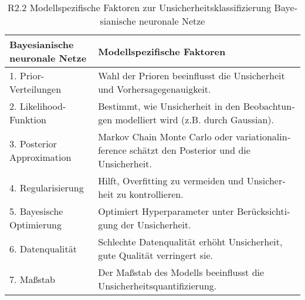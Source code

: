\begin{otherlanguage}{ngerman}
\begin{table}[!htpb]
  \centering
  \footnotesize
  \begin{tabularx}{\textwidth}{|l|X|}
    \hline
    \textbf{\gls{Bayesianische neuronale Netze}} & \textbf{Modellspezifische Faktoren} \\
    \hline
    1. Prior-Verteilungen & Wahl der Prioren beeinflusst die Unsicherheit und Vorhersagegenauigkeit. \\
    \hline
    2. Likelihood-Funktion & Bestimmt, wie Unsicherheit in den Beobachtungen modelliert wird (z.B. durch Gaussian). \\
    \hline
    3. Posterior Approximation & \gls{Markov Chain Monte Carlo} oder \gls{variationalinference} schätzt den Posterior und die Unsicherheit. \\
    \hline
    4. Regularisierung & Hilft, Overfitting zu vermeiden und Unsicherheit zu kontrollieren. \\
    \hline
    5. Bayesische Optimierung & Optimiert Hyperparameter unter Berücksichtigung der Unsicherheit. \\
    \hline
    6. Datenqualität & Schlechte Datenqualität erhöht Unsicherheit, gute Qualität verringert sie. \\
    \hline
    7. Maßstab & Der Maßstab des Modells beeinflusst die Unsicherheitsquantifizierung. \\
    \hline
  \end{tabularx}
  \caption{R2.2 Modellspezifische Faktoren zur Unsicherheitsklassifizierung \gls{Bayesianische neuronale Netze}}\label{tab:chapter6r22}
\end{table}


\end{otherlanguage}
